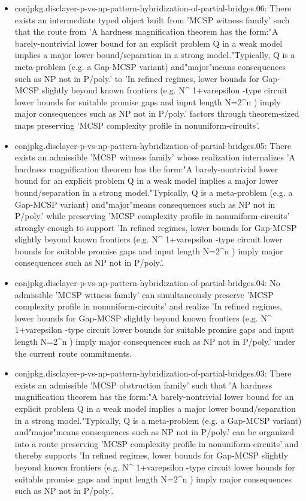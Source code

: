 \documentclass[11pt]{article}
\begin{document}
\begin{itemize}
\item conjpkg.disclayer-p-vs-np-pattern-hybridization-of-partial-bridges.06: There exists an intermediate typed object built from 'MCSP witness family' such that the route from 'A hardness magnification theorem has the form:"A barely-nontrivial lower bound for an explicit problem Q in a weak model implies a major lower bound/separation in a strong model."Typically, Q is a meta-problem (e.g. a Gap-MCSP variant) and"major"means consequences such as NP not in P/poly.' to 'In refined regimes, lower bounds for Gap-MCSP slightly beyond known frontiers (e.g. N\textasciicircum{} 1+varepsilon -type circuit lower bounds for suitable promise gaps and input length N=2\textasciicircum{}n ) imply major consequences such as NP not in P/poly.' factors through theorem-sized maps preserving 'MCSP complexity profile in nonuniform-circuits'.
\item conjpkg.disclayer-p-vs-np-pattern-hybridization-of-partial-bridges.05: There exists an admissible 'MCSP witness family' whose realization internalizes 'A hardness magnification theorem has the form:"A barely-nontrivial lower bound for an explicit problem Q in a weak model implies a major lower bound/separation in a strong model."Typically, Q is a meta-problem (e.g. a Gap-MCSP variant) and"major"means consequences such as NP not in P/poly.' while preserving 'MCSP complexity profile in nonuniform-circuits' strongly enough to support 'In refined regimes, lower bounds for Gap-MCSP slightly beyond known frontiers (e.g. N\textasciicircum{} 1+varepsilon -type circuit lower bounds for suitable promise gaps and input length N=2\textasciicircum{}n ) imply major consequences such as NP not in P/poly.'.
\item conjpkg.disclayer-p-vs-np-pattern-hybridization-of-partial-bridges.04: No admissible 'MCSP witness family' can simultaneously preserve 'MCSP complexity profile in nonuniform-circuits' and realize 'In refined regimes, lower bounds for Gap-MCSP slightly beyond known frontiers (e.g. N\textasciicircum{} 1+varepsilon -type circuit lower bounds for suitable promise gaps and input length N=2\textasciicircum{}n ) imply major consequences such as NP not in P/poly.' under the current route commitments.
\item conjpkg.disclayer-p-vs-np-pattern-hybridization-of-partial-bridges.03: There exists an admissible 'MCSP obstruction family' such that 'A hardness magnification theorem has the form:"A barely-nontrivial lower bound for an explicit problem Q in a weak model implies a major lower bound/separation in a strong model."Typically, Q is a meta-problem (e.g. a Gap-MCSP variant) and"major"means consequences such as NP not in P/poly.' can be organized into a route preserving 'MCSP complexity profile in nonuniform-circuits' and thereby supports 'In refined regimes, lower bounds for Gap-MCSP slightly beyond known frontiers (e.g. N\textasciicircum{} 1+varepsilon -type circuit lower bounds for suitable promise gaps and input length N=2\textasciicircum{}n ) imply major consequences such as NP not in P/poly.'.

\end{itemize}
\end{document}
